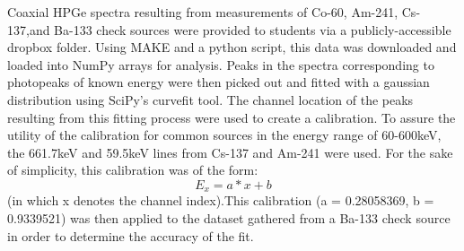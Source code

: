 Coaxial HPGe spectra resulting from measurements of Co-60, Am-241, Cs-137,and Ba-133 check
sources were provided to students via a publicly-accessible dropbox folder. Using MAKE and a 
python script, this data was downloaded and loaded into NumPy arrays for
analysis. Peaks in the spectra corresponding to photopeaks of known energy were
then picked out and fitted with a gaussian distribution using SciPy's
curvefit tool. The channel location of the peaks resulting from this fitting process were used to 
create a calibration. To assure the utility of the calibration for common sources in the energy range of 60-600keV, the
661.7keV and 59.5keV lines from Cs-137 and Am-241 were used. For the sake of simplicity, 
this calibration was of the form: \[E_x = a*x + b\] (in which x denotes
the channel index).This calibration (a = 0.28058369, b = 0.9339521) was then applied to the dataset gathered from
a Ba-133 check source in order to determine the accuracy of the fit.
